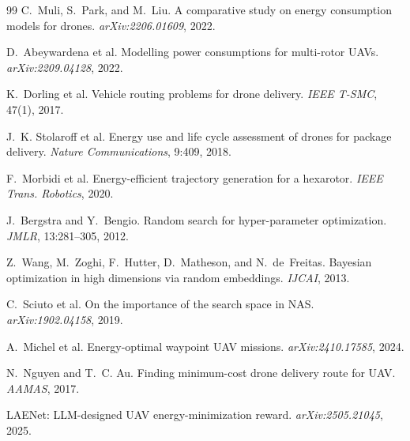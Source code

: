 \documentclass{article}
\begin{document}
\begin{thebibliography}{99}
C.~Muli, S.~Park, and M.~Liu.
A comparative study on energy consumption models for drones.
\emph{arXiv:2206.01609}, 2022.

D.~Abeywardena et al.
Modelling power consumptions for multi-rotor UAVs.
\emph{arXiv:2209.04128}, 2022.

K.~Dorling et al.
Vehicle routing problems for drone delivery.
\emph{IEEE T-SMC}, 47(1), 2017.

J.~K. Stolaroff et al.
Energy use and life cycle assessment of drones for package delivery.
\emph{Nature Communications}, 9:409, 2018.

F.~Morbidi et al.
Energy-efficient trajectory generation for a hexarotor.
\emph{IEEE Trans. Robotics}, 2020.

J.~Bergstra and Y.~Bengio.
Random search for hyper-parameter optimization.
\emph{JMLR}, 13:281--305, 2012.

Z.~Wang, M.~Zoghi, F.~Hutter, D.~Matheson, and N.~de~Freitas.
Bayesian optimization in high dimensions via random embeddings.
\emph{IJCAI}, 2013.

C.~Sciuto et al.
On the importance of the search space in NAS.
\emph{arXiv:1902.04158}, 2019.

A.~Michel et al.
Energy-optimal waypoint UAV missions.
\emph{arXiv:2410.17585}, 2024.

N.~Nguyen and T.~C. Au.
Finding minimum-cost drone delivery route for UAV.
\emph{AAMAS}, 2017.

LAENet: LLM-designed UAV energy-minimization reward.
\emph{arXiv:2505.21045}, 2025.

\end{thebibliography}
\end{document}

